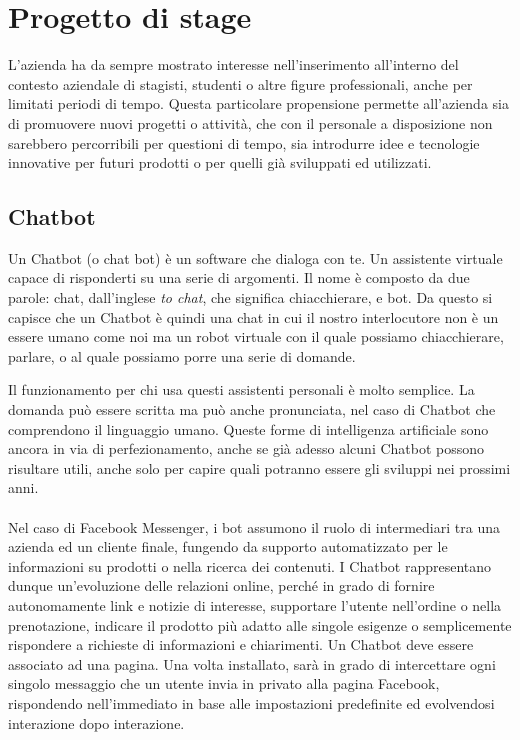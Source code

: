 
\chapter{Progetto di stage}
\label{cap:progetto-stage}

L'azienda \azienda{} ha da sempre mostrato interesse nell'inserimento all'interno del contesto aziendale di stagisti, studenti o altre figure professionali, anche per limitati periodi di tempo. Questa particolare propensione permette all'azienda sia di promuovere nuovi progetti o attività, che con il personale a disposizione non sarebbero percorribili per questioni di tempo, sia introdurre idee e tecnologie innovative per futuri prodotti o per quelli già sviluppati ed utilizzati.

\section{Chatbot}
Un \gls{Chatbot} (o chat bot) è un software che dialoga con te. Un assistente virtuale capace di risponderti su una serie di argomenti. Il nome è composto da due parole: chat, dall’inglese \emph{to chat}, che significa chiacchierare, e bot. Da questo si capisce che un \gls{Chatbot} è quindi una chat in cui il nostro interlocutore non è un essere umano come noi ma un robot virtuale con il quale possiamo chiacchierare, parlare, o al quale possiamo porre una serie di domande.

Il funzionamento per chi usa questi assistenti personali è molto semplice. La domanda può essere scritta ma può anche pronunciata, nel caso di \gls{Chatbot} che comprendono il linguaggio umano. Queste forme di intelligenza artificiale sono ancora in via di perfezionamento, anche se già adesso alcuni \gls{Chatbot} possono risultare utili, anche solo per capire quali potranno essere gli sviluppi nei prossimi anni.\\ \\
Nel caso di Facebook Messenger, i bot assumono il ruolo di intermediari tra una azienda ed un cliente finale, fungendo da supporto automatizzato per le informazioni su prodotti o nella ricerca dei contenuti. I \gls{Chatbot} rappresentano dunque un’evoluzione delle relazioni online, perché in grado di fornire autonomamente link e notizie di interesse, supportare l’utente nell’ordine o nella prenotazione, indicare il prodotto più adatto alle singole esigenze o semplicemente rispondere a richieste di informazioni e chiarimenti. 
Un \gls{Chatbot} deve essere associato ad una pagina. Una volta installato, sarà in grado di intercettare ogni singolo messaggio che un utente invia in privato alla pagina Facebook, rispondendo nell’immediato in base alle impostazioni predefinite ed evolvendosi interazione dopo interazione.

